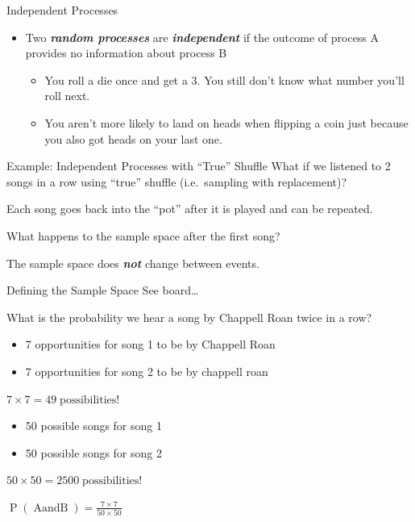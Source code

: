 \documentclass[
  ignorenonframetext,
]{beamer}
\begin{document}
\begin{frame}{Independent Processes}
\label{independent-processes}
\begin{itemize}
\item
  Two \textbf{\emph{random processes}} are \textbf{\emph{independent}}
  if the outcome of process A provides no information about process B

  \begin{itemize}
  \item
    You roll a die once and get a 3. You still don't know what number
    you'll roll next.
  \item
    You aren't more likely to land on heads when flipping a coin just
    because you also got heads on your last one.
  \end{itemize}
\end{itemize}
\end{frame}

\begin{frame}{Example: Independent Processes with ``True'' Shuffle}
\label{example-independent-processes-with-true-shuffle}
What if we listened to 2 songs in a row using ``true'' shuffle
(i.e.~sampling with replacement)?

Each song goes back into the ``pot'' after it is played and can be
repeated.

What happens to the sample space after the first song?

The sample space does \textbf{\emph{not}} change between events.
\end{frame}

\begin{frame}{Defining the Sample Space}
\label{defining-the-sample-space}
See board\ldots{}
\end{frame}

\begin{frame}{What is the probability we hear a song by Chappell Roan
twice in a row?}
\label{what-is-the-probability-we-hear-a-song-by-chappell-roan-twice-in-a-row}
\begin{itemize}
\item
  7 opportunities for song 1 to be by Chappell Roan
\item
  7 opportunities for song 2 to be by chappell roan
\end{itemize}

\(7 \times 7 = 49 \operatorname{possibilities!}\)

\begin{itemize}
\item
  50 possible songs for song 1
\item
  50 possible songs for song 2
\end{itemize}

\(50 \times 50 = 2500 \operatorname{possibilities!}\)

\(\operatorname{P}(\operatorname{A and B})=\frac{7 \times 7}{50 \times 50}\)
\end{frame}
\end{document}
